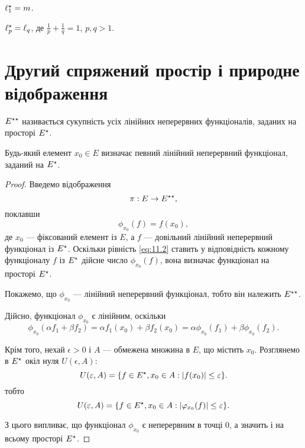 \begin{example}
$\ell^\star_1 = m$.
\end{example}

\begin{example}
$\ell^\star_p = \ell_q$, де $\frac{1}{p} + \frac{1}{q} = 1$, $p, q > 1$.
\end{example}

\section{Другий спряжений простір і природне відображення}

\begin{definition}
 $E^{\star\star}$
називається сукупність усіх лінійних неперервних
функціоналів, заданих на просторі $E^\star$.
\end{definition}

\begin{lemma}
Будь-який елемент $x_0 \in E$ визначає певний
лінійний неперервний функціонал, заданий на $E^\star$.
\end{lemma}

\begin{proof}
Введемо відображення
\begin{equation*}
    \pi: E \to E^{\star\star},
\end{equation*}
поклавши
\begin{equation}
    \label{eq:11.2}
    \phi_{x_0}(f) = f(x_0),
\end{equation}
де $x_0$ --- фіксований елемент із $E$, а $f$ --- довільний лінійний
неперервний функціонал із $E^\star$. Оскільки рівність \eqref{eq:11.2} ставить
у відповідність кожному функціоналу $f$ із $E^\star$ дійсне число
$\phi_{x_0}(f)$, вона визначає функціонал на просторі $E^\star$.

Покажемо, що $\phi_{x_0}$ --- лінійний неперервний функціонал,
тобто він належить $E^{\star\star}$.

Дійсно, функціонал $\phi_{x_0}$ є лінійним, оскільки
\begin{equation*}
    \phi_{x_0}(\alpha f_1 + \beta f_2) =
    \alpha f_1(x_0) + \beta f_2(x_0) =
    \alpha \phi_{x_0}(f_1) + \beta \phi_{x_0}(f_2).
\end{equation*}

Крім того, нехай $\epsilon > 0$ і $A$ --- обмежена множина в $E$, що
містить $x_0$. Розглянемо в $E^\star$ окіл нуля $U(\epsilon, A)$:
\begin{equation*}
    U(\varepsilon, A) = \{f \in E^\star, x_0 \in A: |f(x_0)| \le \varepsilon\}.
\end{equation*}
тобто
\begin{equation*}
    U(\varepsilon, A) = \{f \in E^\star, x_0 \in A: |\varphi_{x_0}(f)| \le \varepsilon\}.
\end{equation*}

З цього випливає, що функціонал $\phi_{x_0}$ є неперервним в
точці $0$, а значить і на всьому просторі $E^\star$. 
\end{proof}

